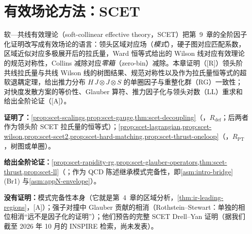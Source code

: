 \chapter{有效场论方法：SCET}\label{ch:scet}

软—共线有效理论（soft-collinear effective theory，SCET）\cite{BauerFlemingLuke2000,BauerEtAl2001,BauerStewart2001,BauerPirjolStewart2002,BauerEtAl2002}把第~9~章的全阶因子化证明改写成有效场论的语言：领头区域对应场（\emph{模式}），硬子图对应匹配系数，区域近似对应多极展开后的拉氏量，Ward 恒等式给出的 Wilson 线对应有效理论的规范对称性，Collins 减除对应\emph{零箱}（zero-bin）减除。本章证明（[R]）领头阶共线拉氏量与共线 Wilson 线的树图结果、规范对称性以及作为拉氏量恒等式的超软退耦定理，给出推力分布 $H\,J\otimes J\otimes S$ 的单圈因子与重整化群（RG）一致性；对快度发散方案的等价性、Glauber 算符、推力因子化与领头对数（LL）重求和给出全阶论证（[A]）。

\begin{tcolorbox}[enhanced,breakable,title=本章证明了什么／没有证明什么,fonttitle=\bfseries,
  colback=gray!3!white,colframe=gray!55!black,boxrule=0.6pt,arc=2pt,
  left=5pt,right=5pt,top=3pt,bottom=3pt,before skip=6pt,after skip=6pt]
\textbf{证明了：}\cref{prop:scet-scalings,prop:scet-gauge,thm:scet-decoupling}（\tagR，$R_{\mathrm{def}}$；后两者作为领头阶 SCET 拉氏量的恒等式）；\cref{prop:scet-lagrangian,prop:scet-wilson,prop:scet-scet2,prop:scet-hard-matching,prop:scet-thrust-oneloop}（\tagR，$R_{\mathrm{PT}}$，树图或单圈）。\par
\textbf{给出全阶论证：}\cref{prop:scet-rapidity-rg,prop:scet-glauber-operators,thm:scet-thrust,prop:scet-ll}（\tagA；作为 QCD 陈述继承模式完备性，即\cref{asm:intro-bridge}(Br1) 与\cref{asm:appN-envelope}）。\par
\textbf{没有证明：}模式完备性本身（它就是第~4~章的区域分析，\cref{thm:ir-leading-regions}，[A]）；强子对撞中 Glauber 贡献的相消（Rothstein--Stewart：单独的相位相消“远不是因子化的证明”）；他们预告的完整 SCET Drell--Yan 证明（据我们截至 2026 年 10 月的 INSPIRE 检索，尚未发表）。
\end{tcolorbox}

